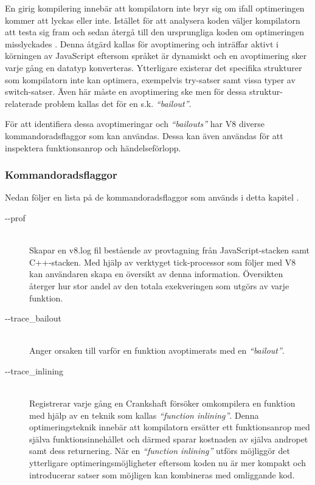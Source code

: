 En girig kompilering innebär att kompilatorn inte bryr sig om ifall
optimeringen kommer att lyckas eller inte. Istället för att analysera koden
väljer kompilatorn att testa sig fram och sedan återgå till den ursprungliga
koden om optimeringen misslyckades \citep{mk10}. Denna åtgärd kallas för
avoptimering och inträffar aktivt i körningen av JavaScript eftersom språket
är dynamiskt och en avoptimering sker varje gång en datatyp konverteras.
Ytterligare existerar det specifika strukturer som kompilatorn inte kan
optimera, exempelvis try-satser samt vissa typer av switch-satser. Även här
måste en avoptimering ske men för dessa struktur-relaterade problem kallas det
för en s.k. \textit{``bailout''}.

För att identifiera dessa avoptimeringar och \textit{``bailouts''} har V8 diverse
kommandoradsflaggor som kan användas. Dessa kan även användas för att
inspektera funktionsanrop och händelseförlopp.

\subsubsection{Kommandoradsflaggor}

Nedan följer en lista på de kommandoradsflaggor som används i detta kapitel
\citep{v8profiler}.

\begin{description}
  \item[-{}-prof] \hfill \\
    Skapar en v8.log fil bestående av provtagning från JavaScript-stacken
    samt C++-stacken. Med hjälp av verktyget tick-processor som följer med V8
    kan användaren skapa en översikt av denna information. Översikten återger
    hur stor andel av den totala exekveringen som utgörs av varje funktion.
  \item[-{}-trace_bailout] \hfill \\
    Anger orsaken till varför en funktion avoptimerats med en
    \textit{``bailout''}.
  \item[-{}-trace_inlining] \hfill \\
    Registrerar varje gång en Crankshaft försöker omkompilera en funktion med
    hjälp av en teknik som kallas \textit{``function inlining''}. Denna
    optimeringsteknik innebär att kompilatorn ersätter ett funktionsanrop med
    själva funktionsinnehållet och därmed sparar kostnaden av själva andropet
    samt dess returnering. När en \textit{``function inlining''} utförs
    möjliggör det ytterligare optimeringsmöjligheter eftersom koden nu är mer
    kompakt och introducerar satser som möjligen kan kombineras med omliggande
    kod.
\end{description}

